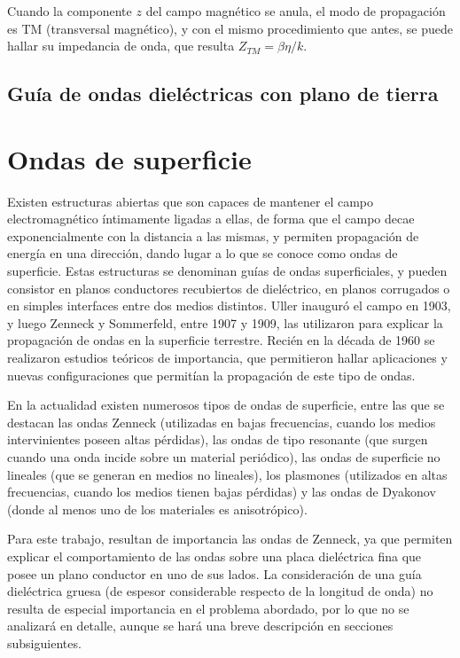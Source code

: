 Cuando la componente $z$ del campo magnético se anula, el modo de propagación es TM (transversal magnético), y con el mismo procedimiento que antes, se puede hallar su impedancia de onda, que resulta $Z_{TM} = \beta \eta / k$.

\subsection{Guía de ondas dieléctricas con plano de tierra}

\section{Ondas de superficie}

Existen estructuras abiertas que son capaces de mantener el campo electromagnético íntimamente ligadas a ellas, de forma que el campo decae exponencialmente con la distancia a las mismas, y permiten propagación de energía en una dirección, dando lugar a lo que se conoce como ondas de superficie. Estas estructuras se denominan guías de ondas superficiales, y pueden consistor en planos conductores recubiertos de dieléctrico, en planos corrugados o en simples interfaces entre dos medios distintos. Uller inauguró el campo en 1903, y luego Zenneck y Sommerfeld, entre 1907 y 1909, las utilizaron para explicar la propagación de ondas en la superficie terrestre. Recién en la década de 1960 se realizaron estudios teóricos de importancia, que permitieron hallar aplicaciones y nuevas configuraciones que permitían la propagación de este tipo de ondas.

En la actualidad existen numerosos tipos de ondas de superficie, entre las que se destacan las ondas Zenneck (utilizadas en bajas frecuencias, cuando los medios intervinientes poseen altas pérdidas), las ondas de tipo resonante (que surgen cuando una onda incide sobre un material periódico), las ondas de superficie no lineales (que se generan en medios no lineales), los plasmones (utilizados en altas frecuencias, cuando los medios tienen bajas pérdidas) y las ondas de Dyakonov (donde al menos uno de los materiales es anisotrópico).

Para este trabajo, resultan de importancia las ondas de Zenneck, ya que permiten explicar el comportamiento de las ondas sobre una placa dieléctrica fina que posee un plano conductor en uno de sus lados. La consideración de una guía dieléctrica gruesa (de espesor considerable respecto de la longitud de onda) no resulta de especial importancia en el problema abordado, por lo que no se analizará en detalle, aunque se hará una breve descripción en secciones subsiguientes.

